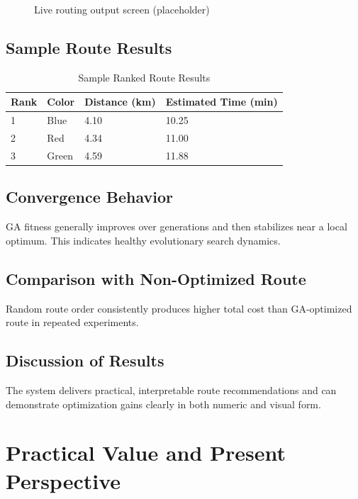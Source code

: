 \documentclass[12pt,a4paper]{report}
\begin{document}
\begin{figure}[H]
\centering
{}
\caption{Live routing output screen (placeholder)}
\label{fig:output-screen}
\end{figure}

\section{Sample Route Results}
\begin{table}[H]
\centering
\caption{Sample Ranked Route Results}
\label{tab:sample-results}
\begin{tabular}{llll}
\toprule
Rank & Color & Distance (km) & Estimated Time (min) \\
\midrule
1 & Blue & 4.10 & 10.25 \\
2 & Red & 4.34 & 11.00 \\
3 & Green & 4.59 & 11.88 \\
\bottomrule
\end{tabular}
\end{table}

\section{Convergence Behavior}
GA fitness generally improves over generations and then stabilizes near a local optimum. This indicates healthy evolutionary search dynamics.

\section{Comparison with Non-Optimized Route}
Random route order consistently produces higher total cost than GA-optimized route in repeated experiments.

\section{Discussion of Results}
The system delivers practical, interpretable route recommendations and can demonstrate optimization gains clearly in both numeric and visual form.

\chapter{Practical Value and Present Perspective}
\end{document}
